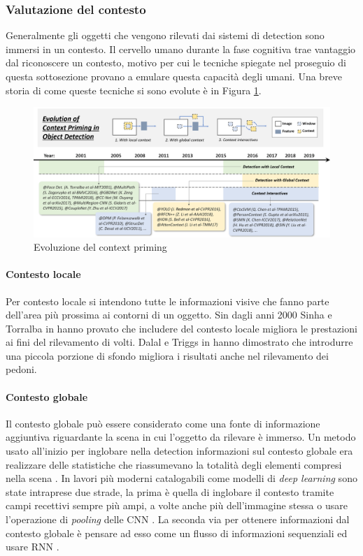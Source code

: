 \subsubsection{Valutazione del contesto}
Generalmente gli oggetti che vengono rilevati dai sistemi di detection sono immersi in un contesto. Il cervello umano durante la fase cognitiva trae vantaggio dal riconoscere un contesto, motivo per cui le tecniche spiegate nel proseguio di questa sottosezione provano a emulare questa capacità degli umani. Una breve storia di come queste tecniche si sono evolute è in Figura \ref{fig:context_history}.
\begin{figure}
    \centering
    \includegraphics[width=\textwidth]{images/evol-context.png}
    \caption{Evoluzione del context priming \cite{DBLP:journals/corr/abs-1905-05055}}
    \label{fig:context_history}
\end{figure}
\paragraph{Contesto locale}
Per contesto locale si intendono tutte le informazioni visive che fanno parte dell'area più prossima ai contorni di un oggetto. Sin dagli anni 2000 Sinha e Torralba in \cite{torralba2001detecting} hanno provato che includere del contesto locale migliora le prestazioni ai fini del rilevamento di volti. Dalal e Triggs in \cite{dalal2005histograms} hanno dimostrato che introdurre una piccola porzione di sfondo migliora i risultati anche nel rilevamento dei pedoni. 
\paragraph{Contesto globale}
Il contesto globale può essere considerato come una fonte di informazione aggiuntiva riguardante la scena in cui l'oggetto da rilevare è immerso. Un metodo usato all'inizio per inglobare nella detection informazioni sul contesto globale era realizzare delle statistiche che riassumevano la totalità degli elementi compresi nella scena \cite{divvala2009empirical}. In lavori più moderni catalogabili come modelli di \textit{deep learning} sono state intraprese due strade, la prima è quella di inglobare il contesto tramite campi recettivi sempre più ampi, a volte anche più dell'immagine stessa \cite{redmon2016you} o  usare l'operazione di \textit{pooling} delle \ac{CNN} \cite{li2018r}. La seconda via per ottenere informazioni dal contesto globale è pensare ad esso come un flusso di informazioni sequenziali ed usare \ac{RNN} \cite{bell2016inside, li2016attentive}. 

